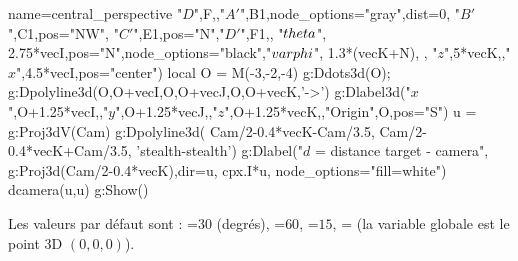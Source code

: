 \begin{center}
\begin{luadraw}{name=central_perspective}
"$D$",F,{},"$A'$",B1,{node_options="gray",dist=0}, "$B'$",C1,{pos="NW"}, "$C'$",E1,{pos="N"},"$D'$",F1,{}, "$\\theta$", 2.75*vecI,{pos="N",node_options="black"},"$\\varphi$", 1.3*(vecK+N), {}, "$z$",5*vecK,{},"$x$",4.5*vecI,{pos="center"})
local O = M(-3,-2,-4)
g:Ddots3d(O); g:Dpolyline3d({{O,O+vecI},{O,O+vecJ},{O,O+vecK}},'->')
g:Dlabel3d("$x$",O+1.25*vecI,{},"$y$",O+1.25*vecJ,{},"$z$",O+1.25*vecK,{},"Origin",O,{pos="S"})
u = g:Proj3dV(Cam)
g:Dpolyline3d( {Cam/2-0.4*vecK-Cam/3.5, Cam/2-0.4*vecK+Cam/3.5}, 'stealth-stealth')
g:Dlabel("$d$ = distance target - camera", g:Proj3d(Cam/2-0.4*vecK),{dir={u, cpx.I*u}, node_options="fill=white"})
dcamera(u,u)
g:Show()
\end{luadraw}
\end{center}

Les valeurs par défaut sont : =$30$ (degrés), =$60$, =$15$, = (la variable globale  est le point 3D $(0,0,0)$). 

